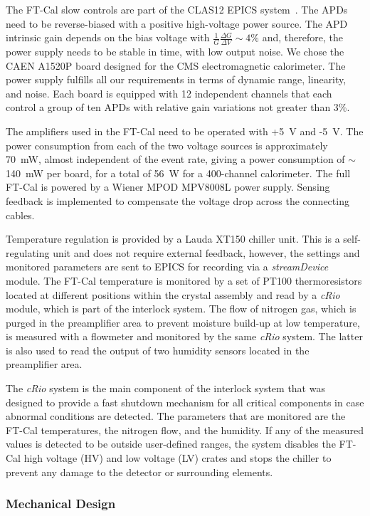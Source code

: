 The FT-Cal slow controls are part of the CLAS12 EPICS system~\cite{daq}. The APDs need to be reverse-biased
with a positive high-voltage power source. The APD intrinsic gain depends on the bias voltage with
$\frac{1}{G}\frac{\Delta G}{\Delta V} \sim4 \%$ and, therefore, the power supply needs to be stable in time, with
low output noise. We chose the CAEN A1520P board designed for the CMS electromagnetic calorimeter. The power
supply fulfills  all our requirements in terms of dynamic range, linearity, and noise. Each board is equipped with 12
independent channels that each control a group of ten APDs with relative gain variations not greater than 3\%.

The amplifiers used in the FT-Cal need to be operated with +5~V and -5~V. The power consumption from each of the
two voltage sources is approximately 70~mW, almost independent of the event rate, giving a power consumption of
$\sim$140~mW per board, for a total of 56~W for a 400-channel calorimeter. The full FT-Cal is powered by a
Wiener MPOD MPV8008L power supply. Sensing feedback is implemented to compensate the voltage drop across the
connecting cables.

Temperature regulation is provided by a Lauda XT150 chiller unit. This is a self-regulating unit and does not require
external feedback, however, the settings and monitored parameters are sent to EPICS for recording via a
{\it streamDevice} module. The FT-Cal temperature is monitored by a set of PT100 thermoresistors located at
different positions within the crystal assembly and read by a {\it cRio} module, which is part of the interlock system.
The flow of nitrogen gas, which is purged in the preamplifier area to prevent moisture build-up at low temperature,
is measured with a flowmeter and monitored by the same {\it cRio} system. The latter is also used to read the output
of two humidity sensors located in the preamplifier area. 

The {\it cRio} system is the main component of the interlock system that was designed to provide a fast shutdown
mechanism for all critical components in case abnormal conditions are detected. The parameters that are monitored
are the FT-Cal temperatures, the nitrogen flow, and the humidity. If any of the measured values is detected to be
outside user-defined ranges, the system disables the FT-Cal high voltage (HV) and low voltage (LV) crates and stops
the chiller to prevent any damage to the detector or surrounding elements.

\subsubsection{Mechanical Design}

